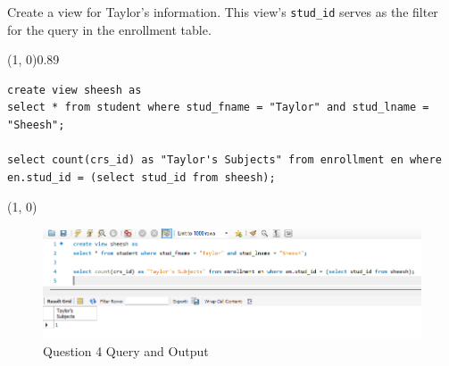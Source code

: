 
Create a view for Taylor's information. This view's \texttt{stud\_id} serves as the filter for the query in the enrollment table.
\vspace{\baselineskip}

\sol{}
\noindent\line(1, 0){0.89\linewidth}
\begin{verbatim}
create view sheesh as
select * from student where stud_fname = "Taylor" and stud_lname = "Sheesh";

select count(crs_id) as "Taylor's Subjects" from enrollment en where
en.stud_id = (select stud_id from sheesh);
\end{verbatim}
\noindent\line(1, 0){\linewidth}

\begin{figure}[H]
    \centering
    \includegraphics[width=0.7\linewidth]{images/q4.png}
    \caption{Question 4 Query and Output}
\end{figure}
